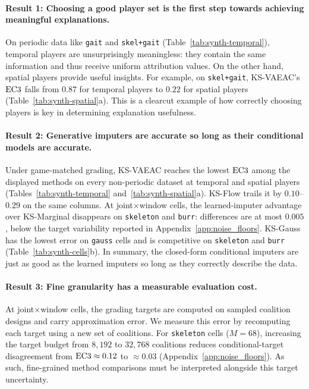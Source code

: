 


\paragraph{Result 1: Choosing a good player set is the first step towards achieving meaningful explanations.}
On periodic data like \texttt{gait} and \texttt{skel+gait}
(Table~\ref{tab:synth-temporal}), temporal players are unsurprisingly meaningless: they contain the same information and thus receive uniform attribution values. On the other hand, spatial players provide useful insights. For example, on \texttt{skel+gait}, KS-VAEAC's $\mathrm{EC3}$ falls from $0.87$ for temporal players to $0.22$ for spatial players (Table~\ref{tab:synth-spatial}a). This is a clearcut example of how correctly choosing players is key in determining explanation usefulness. %

\paragraph{Result 2: Generative imputers are accurate  so long as their conditional models are accurate.}
Under game-matched grading, KS-VAEAC reaches the lowest $\mathrm{EC3}$ among the displayed methods on every non-periodic dataset at temporal and spatial players (Tables~\ref{tab:synth-temporal} and~\ref{tab:synth-spatial}a). KS-Flow trails it by $0.10$--$0.29$ on the same columns. At joint$\times$window cells, the learned-imputer advantage over KS-Marginal disappears on \texttt{skeleton} and \texttt{burr}: differences are at most $0.005$, below the target variability reported in Appendix~\ref{app:noise_floors}. KS-Gauss has the lowest error on \texttt{gauss} cells and is competitive on \texttt{skeleton} and \texttt{burr} (Table~\ref{tab:synth-cells}b). In summary, the closed-form conditional imputers are just as good as the learned imputers so long as they correctly describe the data.

\paragraph{Result 3: Fine granularity has a measurable evaluation cost.}
At joint$\times$window cells, the grading targets are computed on sampled coalition designs and carry approximation error. We measure this error by recomputing each target using a new set of coalitions. For \texttt{skeleton} cells ($M{=}68$), increasing the target budget from $8{,}192$ to $32{,}768$ coalitions reduces conditional-target disagreement from $\mathrm{EC3} \approx 0.12$ to $\approx 0.03$ (Appendix~\ref{app:noise_floors}). As such, fine-grained method comparisons must be interpreted alongside this target uncertainty.

